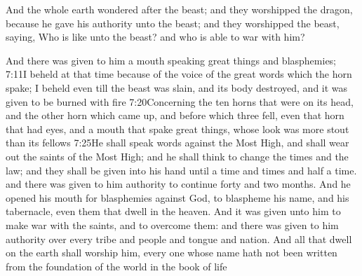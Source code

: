 And the whole earth wondered after the beast; 
and they worshipped the dragon, because he gave his authority unto the beast; and they worshipped the beast, saying, Who is like unto the beast?%
and who is able to war with him? 

And there was given to him a mouth speaking great things and blasphemies;%
				       {7:11}{I beheld at that time because of the voice of the great words which the horn spake; I beheld even till the beast was slain, and its body destroyed, and it was given to be burned with fire}%
					   {7:20}{Concerning the ten horns that were on its head, and the other horn which came up, and before which three fell, even that horn that had eyes, and a mouth that spake great things, whose look was more stout than its fellows}
					   {7:25}{He shall speak words against the Most High, and shall wear out the saints of the Most High; and he shall think to change the times and the law; and they shall be given into his hand until a time and times and half a time.} %
and there was given to him authority to continue forty and two months. 
And he opened his mouth for blasphemies against God, to blaspheme his name, and his tabernacle, even them that dwell in the heaven.%
And it was given unto him to make war with the saints, and to overcome them: and there was given to him authority over every tribe and people and tongue and nation. 
And all that dwell on the earth shall worship him, every one whose name hath not been written from the foundation of the world in the book of life%
